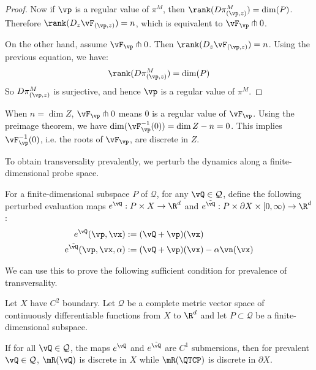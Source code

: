 \begin{proof}
Now if $\vp$ is a regular value of $\pi^{M}$, then
$\rank(D \pi^{M}_{(\vp,z)}) = \dim(P)$. Therefore
$\rank(D_{z} \vF_{(\vp,z)}) = n$, which is equivalent to
$\vF_{\vp} \pitchfork 0$.

On the other hand, assume $\vF_{\vp} \pitchfork 0$. Then
$\rank(D_{z} \vF_{(\vp,z)}) = n$. Using the previous equation, we have:
\[\rank(D \pi^{M}_{(\vp,z)}) = \dim(P)\]
So $D \pi^{M}_{(\vp,z)}$ is surjective, and hence $\vp$ is a regular value of $\pi^{M}$.
\end{proof}

\begin{remark}
    When $n=\dim Z$, $\vF_{\vp} \pitchfork 0$ means $0$ is a regular value of $\vF_{\vp}$. Using the preimage theorem, we have $\dim(\vF_{\vp}^{-1}(0)) = \dim Z - n = 0$. This implies $\vF_{\vp}^{-1}(0)$, i.e. the roots of $\vF_{\vp}$, are discrete in $Z$.
\end{remark}

To obtain transversality prevalently, we perturb the dynamics along a
finite-dimensional probe space.

\begin{definition}
    For a finite-dimensional subspace $P$ of $\mathcal{Q}$, for any $\vQ \in \mathcal{Q}$, define the following perturbed evaluation maps $e^{\vQ}:P\times X\to\R^{d}$ and $e^{\tilde{\vQ}}:P \times \partial X \times [0,\infty) \to \R^{d}$:
    \[
    \begin{aligned}[t]
        e^{\vQ}(\vp,\vx)&:=(\vQ+\vp)(\vx)\\
        e^{\tilde{\vQ}}(\vp,\vx,\alpha)&:=(\vQ+\vp)(\vx) - \alpha \vn(\vx)
    \end{aligned}
    \]
\end{definition}

We can use this to prove the following sufficient condition for prevalence of transversality.

\begin{theorem}\label{theorem:prevalence_submersion_probe}
Let $X$ have $C^2$ boundary. Let $\mathcal Q$ be a complete metric vector space of continuously differentiable functions from $X$ to $\R^d$ and let $P\subset \mathcal Q$ be a finite-dimensional subspace.

If for all $\vQ\in\mathcal Q$, the maps $e^{\vQ}$ and $e^{\tilde{\vQ}}$ are $C^{1}$ submersions, then for prevalent $\vQ \in \mathcal{Q}$, $\mR(\vQ)$ is discrete in $X$ while $\mR(\QTCP)$ is discrete in $\partial X$.
\end{theorem}


